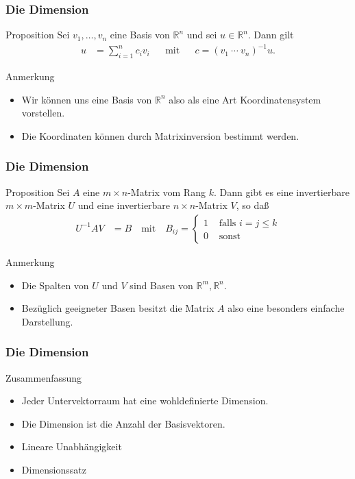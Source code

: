 \documentclass{beamer}
\newcommand\RR{\mathbb R}
\renewcommand{\ae}{\"a}
\renewcommand{\oe}{\"o}
\newcommand{\ue}{\"u}
\newcommand{\mytitle}{Die Dimension}
\begin{document}
\begin{frame}\frametitle{\mytitle}
	\begin{block}{Proposition}
		Sei $v_1,\ldots,v_n$ eine Basis von $\RR^n$ und sei $u\in\RR^n$.
		Dann gilt
		\begin{align*}
			u&=\sum_{i=1}^nc_iv_i&&\mbox{mit}&&c=(v_1\ \cdots\ v_n)^{-1}u.
		\end{align*}
	\end{block}
	\begin{block}{Anmerkung}
		\begin{itemize}
			\item Wir k\oe nnen uns eine Basis von $\RR^n$ also als eine Art Koordinatensystem vorstellen.
			\item Die Koordinaten k\oe nnen durch Matrixinversion bestimmt werden.
		\end{itemize}
	\end{block}
\end{frame}

\begin{frame}\frametitle{\mytitle}
	\begin{block}{Proposition}
		Sei $A$ eine $m\times n$-Matrix vom Rang $k$.
		Dann gibt es eine invertierbare $m\times m$-Matrix $U$ und eine invertierbare $n\times n$-Matrix $V$, so da\ss\
		\begin{align*}
			U^{-1}AV&=B\quad\mbox{mit}\quad B_{ij}=\begin{cases}
				1&\mbox{ falls }i=j\leq k\\
				0&\mbox{ sonst}
			\end{cases}
			\end{align*}
		\end{block}
		\begin{block}{Anmerkung}
			\begin{itemize}
				\item Die Spalten von $U$ und $V$ sind Basen von $\RR^m,\RR^n$.
				\item Bez\ue glich geeigneter Basen besitzt die Matrix $A$ also eine besonders einfache Darstellung.
			\end{itemize}	
		\end{block}
\end{frame}

\begin{frame}\frametitle{\mytitle}
	\begin{block}{Zusammenfassung}
		\begin{itemize}
			\item Jeder Untervektorraum hat eine wohldefinierte Dimension.
			\item Die Dimension ist die Anzahl der Basisvektoren.
			\item Lineare Unabh\ae ngigkeit 
			\item Dimensionssatz
		\end{itemize}
	\end{block}
\end{frame}
\end{document}
